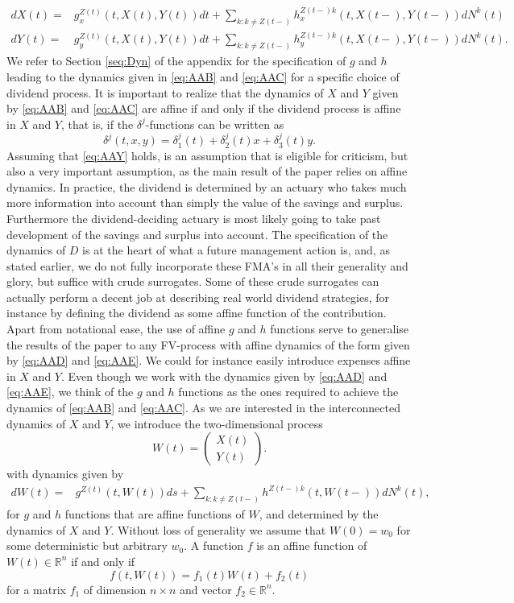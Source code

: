 \documentclass[12pt]{article}
\newcommand{\R}{\mathbb{R}}
\theoremstyle{my_thm}
\begin{document}
\begin{align}
dX(t)=&g^{Z(t)}_{x}(t,X(t),Y(t))dt + \sum_{k:k \neq Z(t-)}  h^{Z(t-)k}_{x}(t,X(t-),Y(t-)) dN^k(t)
\label{eq:AAD}
\\
dY(t)=&g^{Z(t)}_{y}(t,X(t),Y(t))dt + \sum_{k:k \neq Z(t-)} h^{Z(t-)k}_{y}(t,X(t-), Y(t-)) dN^k(t)
\label{eq:AAE}.
\end{align}
We refer to Section \ref{seq:Dyn} of the appendix for the specification of $g$ and $h$ leading to the dynamics given in \eqref{eq:AAB} and \eqref{eq:AAC} for a specific choice of dividend process. It is important to realize that the dynamics of $X$ and $Y$ given by \eqref{eq:AAB} and \eqref{eq:AAC} are affine if and only if the dividend process is affine in $X$ and $Y$, that is, if the $\delta^j$-functions can be written as
\begin{equation}
\delta^j(t,x,y)=\delta_1^j(t)+\delta_2^j(t)x+\delta_3^j(t)y. \label{eq:AAY}
\end{equation}
Assuming that \eqref{eq:AAY} holds, is an assumption that is eligible for criticism, but also a very important assumption, as the main result of the paper relies on affine dynamics. In practice, the dividend is determined by an actuary who takes much more information into account than simply the value of the savings and surplus. Furthermore the dividend-deciding actuary is most likely going to take past development of the savings and surplus into account. The specification of the dynamics of $D$ is at the heart of what a future management action is, and, as stated earlier, we do not fully incorporate these FMA's in all their generality and glory, but suffice with crude surrogates. Some of these crude surrogates can actually perform a decent job at describing real world dividend strategies, for instance by defining the dividend as some affine function of the contribution.
\\[12pt]
Apart from notational ease, the use of affine $g$ and $h$ functions serve to generalise the results of the paper to any FV-process with affine dynamics of the form given by \eqref{eq:AAD} and \eqref{eq:AAE}. We could for instance easily introduce expenses affine in $X$ and $Y$. Even though we work with the dynamics given by \eqref{eq:AAD} and \eqref{eq:AAE}, we think of the $g$ and $h$ functions as the ones required to achieve the dynamics of \eqref{eq:AAB} and \eqref{eq:AAC}. As we are interested in the interconnected dynamics of $X$ and $Y$, we introduce the two-dimensional process 
$$
W(t)= \begin{pmatrix}
X(t)\\
Y(t)
\end{pmatrix}.
$$
with dynamics given by
\begin{align*}
dW(t)=& g^{Z(t)}(t,W(t)) ds+ \sum_{k:k\neq Z(t-)} h^{Z(t-)k}(t,W(t-)) dN^k(t),
\end{align*}
for $g$ and $h$ functions that are affine functions of $W$, and determined by the dynamics of $X$ and $Y$. Without loss of generality we assume that $W(0)=w_0$ for some deterministic but arbitrary $w_0$. A function $f$ is an affine function of $W(t)\in \R^n$ if and only if
$$
f(t,W(t))=f_1(t) W(t) + f_2(t)
$$
for a matrix $f_1$ of dimension $n \times n$ and vector $f_2 \in \R^n$.
\end{document}
